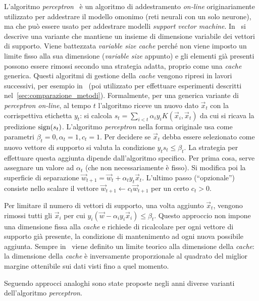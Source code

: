 L'algoritmo \emph{perceptron}~\cite{1958_perceptron} è un algoritmo di addestramento \emph{on-line} originariamente utilizzato per addestrare il modello omonimo (reti neurali con un solo neurone), ma che può essere usato per addestrare modelli \emph{support vector machine}.
In~\cite{2003_online_classification_on_a_budget} si descrive una variante che mantiene un insieme di dimensione variabile dei vettori di supporto. 
Viene battezzata \emph{variable size cache} perché non viene imposto un limite fisso alla sua dimensione (\emph{variable size} appunto) e gli elementi già presenti possono essere rimossi secondo una strategia adatta, proprio come una \emph{cache} generica. 
Questi algoritmi di gestione della \emph{cache} vengono ripresi in lavori successivi, per esempio in~\cite{2012_bsgd} (poi utilizzato per effettuare esperimenti descritti nel~\cref{sec:comparazione_metodi}).
Formalmente, per una generica variante di \emph{perceptron on-line}, al tempo $t$ l'algoritmo riceve un nuovo dato $\Vec{x}_t$ con la corrispettiva etichetta $y_t$: si calcola $s_t = \sum_{i<t} \alpha_iy_iK(\Vec{x}_i, \Vec{x}_t)$ da cui si ricava la predizione $\mathrm{sign}(s_t)$. 
L'algoritmo \emph{perceptron} nella forma originale usa come parametri $\beta_t=0, \alpha_t=1, c_t=1$. 
Per decidere se $\Vec{x}_t$ debba essere selezionato come nuovo vettore di supporto si valuta la condizione $y_ts_t \leq \beta_t$.
La strategia per effettuare questa aggiunta dipende dall'algoritmo specifico. 
Per prima cosa, serve assegnare un valore ad $\alpha_t$ (che non necessariamente è fisso). 
Si modifica poi la superficie di separazione $\Vec{w}_{t+1} = \Vec{w}_t + \alpha_ty_t\Vec{x}_t$. 
L'ultimo passo (``opzionale'') consiste nello scalare il vettore $\Vec{w}_{t+1} \leftarrow c_t\Vec{w}_{t+1}$ per un certo $c_t > 0$. 

Per limitare il numero di vettori di supporto, una volta aggiunto $\Vec{x}_t$, vengono rimossi tutti gli $\Vec{x}_i$ per cui $y_i(\Vec{w} - \alpha_iy_i\Vec{x}_i)\leq \beta_t$. 
Questo approccio non impone una dimensione fissa alla \emph{cache} e richiede di ricalcolare per ogni vettore di supporto già presente, la condizione di mantenimento ad ogni nuova possibile aggiunta. 
Sempre in~\cite{2003_online_classification_on_a_budget} viene definito un limite teorico alla dimensione della \emph{cache}: la dimensione della \emph{cache} è inversamente proporzionale al quadrato del miglior margine ottenibile sui dati visti fino a quel momento.

Seguendo approcci analoghi sono state proposte negli anni diverse varianti dell'algoritmo \emph{perceptron}.

